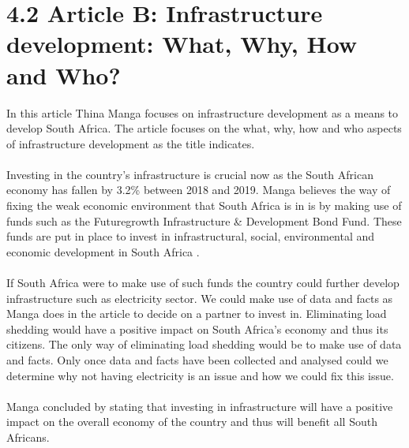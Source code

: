 \section*{4.2 Article B: Infrastructure development: What, Why, How and Who?}
In this article Thina Manga focuses on infrastructure development as a means to develop South Africa. The article focuses on the what, why, how and who aspects of infrastructure development as the title indicates. \cite{Manga2019}
\\\\
Investing in the country’s infrastructure is crucial now as the South African economy has fallen by 3.2\% between 2018 and 2019. Manga believes the way of fixing the weak economic environment that South Africa is in is by making use of funds such as the Futuregrowth Infrastructure \& Development Bond Fund. These funds are put in place to invest in infrastructural, social, environmental and economic development in South Africa \cite{Manga2019}.
\\\\
If South Africa were to make use of such funds the country could further develop infrastructure such as electricity sector. We could make use of data and facts as Manga does in the article to decide on a partner to invest in. Eliminating load shedding would have a positive impact on South Africa’s economy and thus its citizens. The only way of eliminating load shedding would be to make use of data and facts. Only once data and facts have been collected and analysed could we determine why not having electricity is an issue and how we could fix this issue. \cite{Manga2019}
\\\\
Manga concluded by stating that investing in infrastructure will have a positive impact on the overall economy of the country and thus will benefit all South Africans. \cite{Manga2019} 
